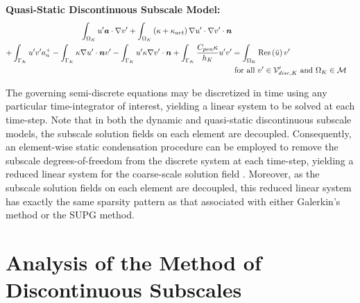 \documentclass[11pt]{article}
\begin{document}
\noindent \textbf{Quasi-Static Discontinuous Subscale Model:}
\begin{equation}
\begin{aligned}
\int_{\Omega_K} u' \bm{a} \cdot \nabla v' +  \int_{\Omega_K} \left(\kappa + \kappa_{art} \right) \nabla u' \cdot \nabla v' \cdot \bm{n}\\ + \int_{\Gamma_K} u' v' a_n^+ - \int_{\Gamma_K} \kappa \nabla u' \cdot \bm{n} v' - \int_{\Gamma_K} u' \kappa \nabla v' \cdot \bm{n} + \int_{\Gamma_K} \frac{C_{pen} \kappa}{h_K} u' v' &= \int_{\Omega_K} \textup{Res}\left(\bar{u}\right) v' \\ & \textup{ for all } v' \in \mathcal{V}'_{disc,K} \textup{ and } \Omega_K \in \mathcal{M}
\end{aligned}
\end{equation}

The governing semi-discrete equations may be discretized in time using any particular time-integrator of interest, yielding a linear system to be solved at each time-step.  Note that in both the dynamic and quasi-static discontinuous subscale models, the subscale solution fields on each element are decoupled.  Consequently, an element-wise static condensation procedure can be employed to remove the subscale degrees-of-freedom from the discrete system at each time-step, yielding a reduced linear system for the coarse-scale solution field \cite{Wilson74}.  Moreover, as the subscale solution fields on each element are decoupled, this reduced linear system has exactly the same sparsity pattern as that associated with either Galerkin's method or the SUPG method.

\section{Analysis of the Method of Discontinuous Subscales} \label{analysis}
\end{document}
